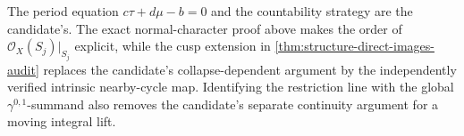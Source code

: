 \begin{remark}
The period equation \(c\tau+d\mu-b=0\) and the countability strategy are
the candidate's.  The exact normal-character proof above makes the order of
\(\mathcal O_X(S_j)|_{S_j}\) explicit, while the cusp extension in
\cref{thm:structure-direct-images-audit} replaces the candidate's
collapse-dependent argument by the independently verified intrinsic
nearby-cycle map.  Identifying the restriction line with the global
\(\gamma^{0,1}\)-summand also removes the candidate's separate continuity
argument for a moving integral lift.
\end{remark}
